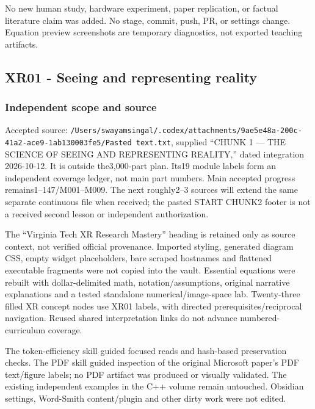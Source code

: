 No new human study, hardware experiment, paper replication, or factual literature claim was added. No stage, commit, push, PR, or settings change. Equation preview screenshots are temporary diagnostics, not exported teaching artifacts.

\subsection{XR01 - Seeing and representing reality}\label{appendix-a103e7846d21-xr01---seeing-and-representing-reality}

\hypertarget{appendix-a103e7846d21-xr01---seeing-and-representing-reality}{}

\subsubsection{Independent scope and source}\label{appendix-a103e7846d21-independent-scope-and-source}

\hypertarget{appendix-a103e7846d21-independent-scope-and-source}{}

Accepted source: \texttt{/Users/swayamsingal/.codex/attachments/9ae5e48a-200c-41a2-ace9-1ab130003fe5/Pasted\ text.txt}, supplied ``CHUNK 1 --- THE SCIENCE OF SEEING AND REPRESENTING REALITY,'' dated integration 2026-10-12. It is outside the3,000-part plan. Its19 module labels form an independent coverage ledger, not main part numbers. Main accepted progress remains1--147/M001--M009. The next roughly2--3 sources will extend the same separate continuous file when received; the pasted START CHUNK2 footer is not a received second lesson or independent authorization.

The ``Virginia Tech XR Research Mastery'' heading is retained only as source context, not verified official provenance. Imported styling, generated diagram CSS, empty widget placeholders, bare scraped hostnames and flattened executable fragments were not copied into the vault. Essential equations were rebuilt with dollar-delimited math, notation/assumptions, original narrative explanations and a tested standalone numerical/image-space lab. Twenty-three filled XR concept nodes use XR01 labels, with directed prerequisites/reciprocal navigation. Reused shared interpretation links do not advance numbered-curriculum coverage.

The token-efficiency skill guided focused reads and hash-based preservation checks. The PDF skill guided inspection of the original Microsoft paper's PDF text/figure labels; no PDF artifact was produced or visually validated. The existing independent examples in the C++ volume remain untouched. Obsidian settings, Word-Smith content/plugin and other dirty work were not edited.


